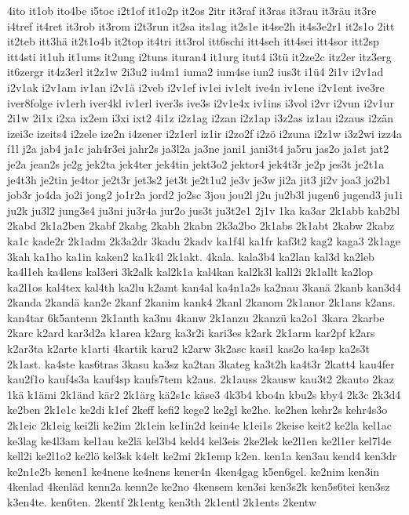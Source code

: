 {4ito
it1ob
ito4be
i5toc
i2t1of
it1o2p
it2os
2itr
it3raf
it3ras
it3rau
it3räu
it3re
i4tref
it4ret
it3rob
it3rom
i2t3run
it2sa
its1ag
it2s1e
it4se2h
it4s3e2r1
it2s1o
2itt
it2teb
itt3hä
it2t1o4b
it2top
it4tri
itt3rol
itt6schi
itt4seh
itt4sei
itt4sor
itt2sp
itt4sti
it1uh
it1ums
it2ung
i2tuns
ituran4
it1urg
itut4
i3tü
it2ze2c
itz2er
itz3erg
it6zergr
it4z3erl
it2z1w
2i3u2
iu4m1
iuma2
ium4se
iun2
ius3t
i1ü4
2i1v
i2v1ad
i2v1ak
i2v1am
iv1an
i2v1ä
i2veb
i2v1ef
iv1ei
iv1elt
ive4n
iv1ene
i2v1ent
ive3re
iver8folge
iv1erh
iver4kl
iv1erl
iver3s
ive3s
i2v1e4x
iv1ins
i3vol
i2vr
i2vun
i2v1ur
2i1w
2i1x
i2xa
ix2em
i3xi
ixt2
4i1z
i2z1ag
i2zan
i2z1ap
i3z2as
iz1au
i2zaus
i2zän
izei3c
izeits4
i2zele
ize2n
i4zener
i2z1erl
iz1ir
i2zo2f
i2zö
i2zuna
i2z1w
i3z2wi
izz4a
í1l
j2a
jab4
ja1c
jah4r3ei
jahr2s
ja3l2a
ja3ne
jani1
jani3t4
ja5ru
jas2o
ja1st
jat2
je2a
jean2s
je2g
jek2ta
jek4ter
jek4tin
jekt3o2
jektor4
jek4t3r
je2p
jes3t
je2t1a
je4t3h
je2tin
je4tor
je2t3r
jet3s2
jet3t
je2t1u2
je3v
je3w
ji2a
jit3
ji2v
joa3
jo2b1
job3r
jo4da
jo2i
jong2
jo1r2a
jord2
jo2sc
3jou
jou2l
j2u
ju2b3l
jugen6
jugend3
ju1i
ju2k
ju3l2
jung3s4
ju3ni
ju3r4a
jur2o
jus3t
ju3t2e1
2j1v
1ka
ka3ar
2k1abb
kab2bl
2kabd
2k1a2ben
2kabf
2kabg
2kabh
2kabn
2k3a2bo
2k1abs
2k1abt
2kabw
2kabz
ka1c
kade2r
2k1adm
2k3a2dr
3kadu
2kadv
ka1f4l
ka1fr
kaf3t2
kag2
kaga3
2k1age
3kah
ka1ho
ka1in
kaken2
ka1k4l
2k1akt.
4kala.
kala3b4
ka2lan
kal3d
ka2leb
ka4l1eh
ka4lens
kal3eri
3k2alk
kal2k1a
kal4kan
kal2k3l
kall2i
2k1allt
ka2lop
ka2l1os
kal4tex
kal4th
ka2lu
k2amt
kan4al
ka4n1a2s
ka2nau
3kanä
2kanb
kan3d4
2kanda
2kandä
kan2e
2kanf
2kanim
kank4
2kanl
2kanom
2k1anor
2k1ans
k2ans.
kan4tar
6k5antenn
2k1anth
ka3nu
4kanw
2k1anzu
2kanzü
ka2o1
3kara
2karbe
2karc
k2ard
kar3d2a
k1area
k2arg
ka3r2i
kari3es
k2ark
2k1arm
kar2pf
k2ars
k2ar3ta
k2arte
k1arti
4kartik
karu2
k2arw
3k2asc
kasi1
kas2o
ka4sp
ka2s3t
2k1ast.
ka4ste
kas6tras
3kasu
ka3sz
ka2tan
3kateg
ka3t2h
ka4t3r
2katt4
kau4fer
kau2f1o
kauf4s3a
kauf4sp
kaufs7tem
k2aus.
2k1auss
2kausw
kau3t2
2kauto
2kaz
1kä
k1ämi
2k1änd
kär2
2k1ärg
kä2s1c
käse3
4k3b4
kbo4n
kbu2s
kby4
2k3c
2k3d4
ke2ben
2k1e1c
ke2di
k1ef
2keff
kefi2
kege2
ke2gl
ke2he.
ke2hen
kehr2s
kehr4s3o
2k1eic
2k1eig
kei2li
ke2im
2k1ein
ke1in2d
kein4e
k1ei1s
2keise
keit2
ke2la
kel1ac
ke3lag
ke4l3am
kel1au
ke2lä
kel3b4
keld4
kel3eis
2ke2lek
ke2l1en
ke2l1er
kel7l4e
kell2i
ke2l1o2
ke2lö
kel3sk
k4elt
ke2mi
2k1emp
k2en.
ken1a
ken3au
kend4
ken3dr
ke2n1e2b
kenen1
ke4nene
ke4nens
kener4n
4ken4gag
k5en6gel.
ke2nim
ken3in
4kenlad
4kenläd
kenn2a
kenn2e
ke2no
4kensem
ken3si
ken3s2k
ken5s6tei
ken3sz
k3en4te.
ken6ten.
2kentf
2k1entg
ken3th
2k1entl
2k1ents
2kentw
}
